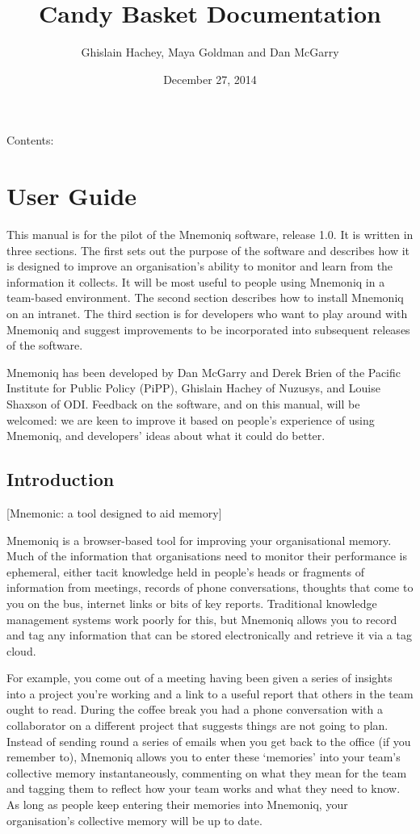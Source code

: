 \documentclass[letterpaper,10pt,english]{sphinxmanual}
\title{Candy Basket Documentation}
\date{December 27, 2014}
\author{Ghislain Hachey, Maya Goldman and Dan McGarry}
\begin{document}
\maketitle
\tableofcontents
{}\label{index::doc}


Contents:


\chapter{User Guide}
\label{user-guide:user-guide}\label{user-guide:candy-basket-s-documentation}\label{user-guide::doc}
This manual is for the pilot of the Mnemoniq software, release 1.0.
It is written in three sections.  The first sets out the purpose of
the software and describes how it is designed to improve an
organisation's ability to monitor and learn from the information it
collects.  It will be most useful to people using Mnemoniq in a
team-based environment.  The second section describes how to install
Mnemoniq on an intranet.  The third section is for developers who want
to play around with Mnemoniq and suggest improvements to be
incorporated into subsequent releases of the software.

Mnemoniq has been developed by Dan McGarry and Derek Brien of the
Pacific Institute for Public Policy (PiPP), Ghislain Hachey of
Nuzusys, and Louise Shaxson of ODI.  Feedback on the software, and on
this manual, will be welcomed: we are keen to improve it based on
people's experience of using Mnemoniq, and developers' ideas about
what it could do better.


\section{Introduction}
\label{user-guide:introduction}
{[}Mnemonic: a tool designed to aid memory{]}

Mnemoniq is a browser-based tool for improving your organisational
memory. Much of the information that organisations need to monitor
their performance is ephemeral, either tacit knowledge held in
people's heads or fragments of information from meetings, records of
phone conversations, thoughts that come to you on the bus, internet
links or bits of key reports.  Traditional knowledge management
systems work poorly for this, but Mnemoniq allows you to record and
tag any information that can be stored electronically and retrieve it
via a tag cloud.

For example, you come out of a meeting having been given a series of
insights into a project you're working and a link to a useful report
that others in the team ought to read. During the coffee break you had
a phone conversation with a collaborator on a different project that
suggests things are not going to plan.  Instead of sending round a
series of emails when you get back to the office (if you remember to),
Mnemoniq allows you to enter these `memories' into your team's
collective memory instantaneously, commenting on what they mean for
the team and tagging them to reflect how your team works and what they
need to know.  As long as people keep entering their memories into
Mnemoniq, your organisation's collective memory will be up to date.
\end{document}
